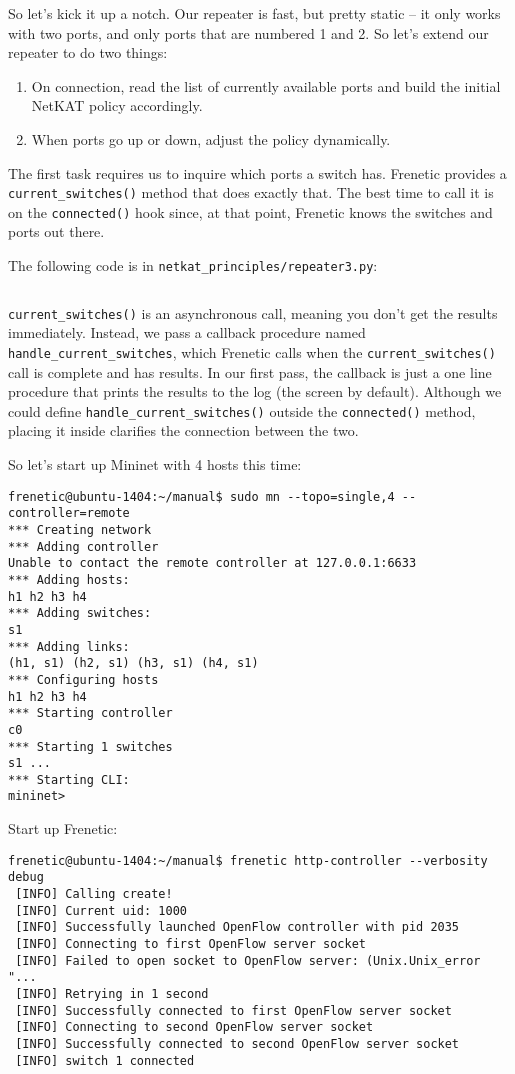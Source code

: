 So let's kick it up a notch.  
Our repeater is fast, but pretty static -- it only works with two ports, and only ports that are numbered
1 and 2.
So let's extend our repeater to do two things: 

\begin{enumerate}
\item On connection, read the list of currently available ports and build the initial NetKAT policy accordingly.
\item When ports go up or down, adjust the policy dynamically.
\end{enumerate}

The first task requires us to inquire which ports a switch has.  Frenetic provides a \texttt{current\_switches()}
method that does exactly that.   The best time to call it is on the \texttt{connected()} hook since, at that
point, Frenetic knows the switches and ports out there.

The following code is in \texttt{netkat\_principles/repeater3.py}:

\inputminted{python}{code/netkat_principles/repeater3.py}

\texttt{current\_switches()} is an asynchronous call, meaning you don't get the results immediately.
Instead, we pass a callback procedure named \texttt{handle\_current\_switches}, which Frenetic calls
when the \texttt{current\_switches()} call is complete and has results.  In our first pass, the callback
is just a one line procedure that prints the results to the log (the screen by default).  Although
we could define \texttt{handle\_current\_switches()} outside the \texttt{connected()} method, placing
it inside clarifies the connection between the two.  

So let's start up Mininet with 4 hosts this time:

\begin{verbatim}
frenetic@ubuntu-1404:~/manual$ sudo mn --topo=single,4 --controller=remote
*** Creating network
*** Adding controller
Unable to contact the remote controller at 127.0.0.1:6633
*** Adding hosts:
h1 h2 h3 h4
*** Adding switches:
s1
*** Adding links:
(h1, s1) (h2, s1) (h3, s1) (h4, s1)
*** Configuring hosts
h1 h2 h3 h4
*** Starting controller
c0
*** Starting 1 switches
s1 ...
*** Starting CLI:
mininet>
\end{verbatim}

Start up Frenetic:

\begin{verbatim}
frenetic@ubuntu-1404:~/manual$ frenetic http-controller --verbosity debug
 [INFO] Calling create!
 [INFO] Current uid: 1000
 [INFO] Successfully launched OpenFlow controller with pid 2035
 [INFO] Connecting to first OpenFlow server socket
 [INFO] Failed to open socket to OpenFlow server: (Unix.Unix_error "...
 [INFO] Retrying in 1 second
 [INFO] Successfully connected to first OpenFlow server socket
 [INFO] Connecting to second OpenFlow server socket
 [INFO] Successfully connected to second OpenFlow server socket
 [INFO] switch 1 connected
\end{verbatim}

